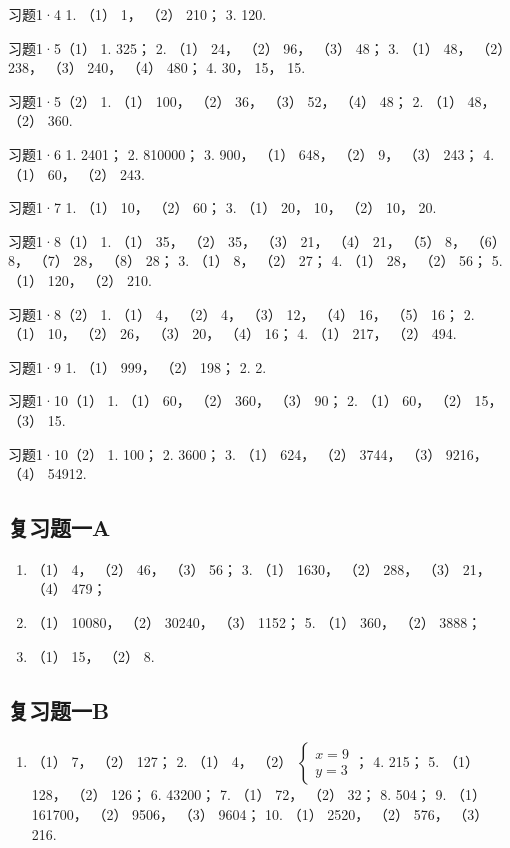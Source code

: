 习题1·4 1. （1） 1， （2） 210； 3. 120.

习题1·5（1） 1. 325； 2. （1） 24， （2） 96， （3） 48； 3. （1） 48，
（2） 238， （3） 240， （4） 480； 4. 30， 15， 15.

习题1·5（2） 1. （1） 100， （2） 36， （3） 52， （4） 48； 2. （1）
48， （2） 360.

习题1·6 1. 2401； 2. 810000； 3. 900， （1） 648， （2） 9， （3） 243；
4. （1） 60， （2） 243.

习题1·7 1. （1） 10， （2） 60； 3. （1） 20， 10， （2） 10， 20.

习题1·8（1） 1. （1） 35， （2） 35， （3） 21， （4） 21， （5） 8，
（6） 8， （7） 28， （8） 28； 3. （1） 8， （2） 27； 4. （1） 28，
（2） 56； 5. （1） 120， （2） 210.

习题1·8（2） 1. （1） 4， （2） 4， （3） 12， （4） 16， （5） 16； 2.
（1） 10， （2） 26， （3） 20， （4） 16； 4. （1） 217， （2） 494.

习题1·9 1. （1） 999， （2） 198； 2. 2.

习题1·10（1） 1. （1） 60， （2） 360， （3） 90； 2. （1） 60， （2）
15， （3） 15.

习题1·10（2） 1. 100； 2. 3600； 3. （1） 624， （2） 3744， （3）
9216， （4） 54912.

\subsection{复习题一A}

\begin{enumerate}[start=2]
\item
  （1） 4， （2） 46， （3） 56； 3. （1） 1630， （2） 288， （3） 21，
  （4） 479；
\item
  （1） 10080， （2） 30240， （3） 1152； 5. （1） 360， （2） 3888；
\item
  （1） 15， （2） 8.
\end{enumerate}

\subsection{复习题一B}

\begin{enumerate}
\item
  （1） 7， （2） 127； 2. （1） 4， （2）
  \(\left\{ \begin{array}{l} x = 9 \\ y = 3 \end{array} \right.\)； 4.
  215； 5. （1） 128， （2） 126； 6. 43200； 7. （1） 72， （2） 32；
  8. 504； 9. （1） 161700， （2） 9506， （3） 9604； 10. （1） 2520，
  （2） 576， （3） 216.
\end{enumerate}

